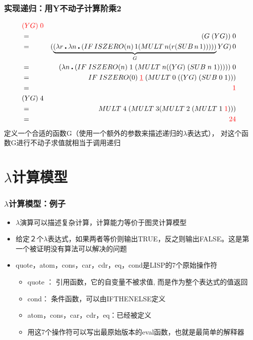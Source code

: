 \documentclass[CJK,compress,hyperref]{beamer}
\begin{document}
\begin{CJK}{UTF8}{song}
\begin{frame}
  \frametitle{实现递归：用Y不动子计算阶乘2} 
  \begin{eqnarray*} 
    & {\color{red}(YG) \; 0} &    \\
    & =  & (G \; (YG)) \; 0 \\  
    & = & (\underbrace{(\lambda r \centerdot \lambda n \centerdot  (IF \, ISZERO(n) \, 1 (MULT \, n (r (SUB \, n \,1)))))}_G YG) \, 0 \\
    & =  & (\lambda n \centerdot (IF \; ISZERO(n) \; 1 \; (MULT \; n ((YG) \; (SUB \; n \; 1))))) \;0 \\
    & = & IF \; ISZERO(0) \; {\color{red}\underline{1}} \; (MULT \; 0 \; ((YG) \; (SUB \;0 \;1))) \\ 
    & =  & {\color{red}1} \\
    & (YG) \; 4 &  \\ 
    & = &  MULT \; 4 \; (MULT \; 3 (MULT \; 2 \; (MULT \; 1 \; {\color{red}1}))) \\ 
    & =  & {\color{red}24}
  \end{eqnarray*} 
  {\color{red}定义一个合适的函数G（使用一个额外的参数来描述递归的$\lambda$表达式）， 对这个函数G进行不动子求值就相当于调用递归}
\end{frame}

\section{$\lambda$计算模型}

\begin{frame}
  \frametitle{$\lambda$计算模型：例子} 
  \begin{itemize}
  \item $\lambda$演算可以描述复杂计算，计算能力等价于图灵计算模型 
  \item 给定２个$\lambda$表达式，如果两者等价则输出TRUE，反之则输出FALSE。这是第一个被证明{\color{red}没有算法可以解决}的问题
  \item quote，atom，cons，car，cdr，eq，cond是LISP的7个原始操作符 
    \begin{itemize}
    \item quote ： 引用函数，它的自变量不被求值, 而是作为整个表达式的值返回
    \item cond： 条件函数，可以由IFTHENELSE定义
    \item atom，cons，car，cdr，eq：已经被定义
    \item 用这7个操作符可以写出最原始版本的eval函数，也就是最简单的{\color{red}解释器}\cite{RootsOfLisp}
    \end{itemize}
  \end{itemize}
\end{frame} 


\end{CJK}
\end{document}
